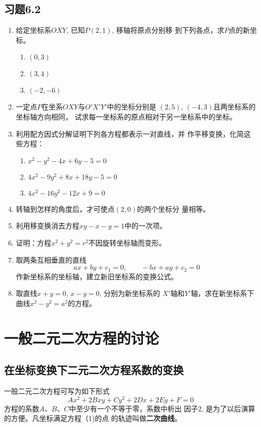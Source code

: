 \subsection*{习题6.2}
\begin{enumerate}
    \item 给定坐标系$OXY$, 已知$P(2,1)$, 移轴将原点分别移
    到下列各点，求$P$点的新坐标。
\begin{multicols}{3}
    \begin{enumerate}
        \item $(0,3)$
        \item $(3,4)$
        \item $(-2,-6)$
    \end{enumerate}
\end{multicols}

    \item 一定点$P$在坐系$OXY$与$O'X'Y'$中的坐标分别是
    $(2,5)$, $(-4,3)$且两坐标系的坐标轴方向相同，
    试求每一坐标系的原点相对于另一坐标系中的坐标。
    \item 利用配方因式分解证明下列各方程都表示一对直线，并
    作平移变换，化简这些方程：
\begin{enumerate}
\item $x^2-y^2-4x+6y-5=0$
\item $4x^2-9y^2+8x+18y-5=0$
\item $4x^2-16y^2-12x+9=0$
\end{enumerate}

    \item 转轴到怎样的角度后，才可使点$(2,0)$的两个坐标分
    量相等。
    \item 利用移变换消去方程$xy-x-y=1$中的一次项。
    \item 证明：方程$x^2+y^2=r^2$不因旋转坐标轴而变形。
    \item 取两条互相垂直的直线
  \[  ax+by+c_1=0,\qquad -bx+ay+c_2=0\]
    作新坐标系的坐标轴，建立新旧坐标系的变换公式。
    \item 取直线$x+y=0$, $x-y=0$, 分别为新坐标系的
    $X'$轴和$Y'$轴，求在新坐标系下曲线$x^2-y^2=a^2$的方程。
\end{enumerate}

\section{一般二元二次方程的讨论}
\subsection{在坐标变换下二元二次方程系数的变换}
一般二元二次方程可写为如下形式
\begin{equation}
    Ax^2+2Bxy+Cy^2+2Dx+2Ey+F=0
\end{equation}
方程的系数$A$、$B$、$C$中至少有一个不等于零，系数中析出
因子2, 是为了以后演算的方便。凡坐标满足方程（1)的点
的轨迹叫做\textbf{二次曲线}。

